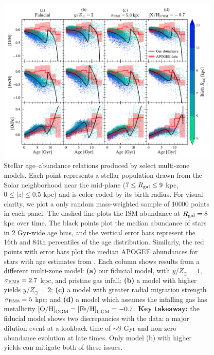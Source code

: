 \documentclass[twocolumn,twocolappendix,linenumbers]{aastex631}
\begin{document}
\begin{figure}
    \centering
    \includegraphics{figures/abundance_evolution.pdf}
    \caption{Stellar age--abundance relations produced by select multi-zone models. Each point represents a stellar population drawn from the Solar neighborhood near the mid-plane ($7\leq R_{\rm gal}\leq 9$ kpc, $0\leq |z| \leq 0.5$ kpc) and is color-coded by its birth radius. For visual clarity, we plot a only random mass-weighted sample of \num{10000} points in each panel. The dashed line plots the ISM abundance at $R_{\rm gal}=8$ kpc over time. The black points plot the median abundance of stars in 2 Gyr-wide age bins, and the vertical error bars represent the 16th and 84th percentiles of the age distribution. Similarly, the red points with error bars plot the median APOGEE abundances for stars with age estimates from \citet{leung_variational_2023}. Each column shows results from a different multi-zone model: {\bf (a)} our fiducial model, with $y/Z_\odot=1$, $\sigma_{\rm RM8}=2.7$ kpc, and pristine gas infall; {\bf (b)} a model with higher yields $y/Z_\odot=2$; {\bf (c)} a model with greater radial migration strength $\sigma_{\rm RM8}=5$ kpc; and {\bf (d)} a model which assumes the infalling gas has metallicity ${\rm [O/H]}_{\rm CGM}={\rm [Fe/H]}_{\rm CGM}=-0.7$. {\bf Key takeaway:} the fiducial model shows two discrepancies with the data: a major dilution event at a lookback time of $\sim9$ Gyr and non-zero abundance evolution at late times. Only model (b) with higher yields can mitigate both of these issues.}
    \label{fig:abundance-evolution}
\end{figure}
\end{document}
